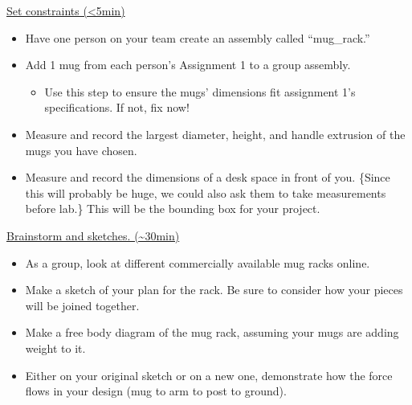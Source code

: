 \documentclass[11pt,letterpaper]{article}
\begin{document}
\begin{AssignmentSteps}
  \item \underline{Set constraints (\textless5min)}
    \begin{itemize}
      \item Have one person on your team create an assembly called ``mug\_rack.''
      \item Add 1 mug from each person's Assignment 1 to a group assembly.
        \begin{itemize}
          \item Use this step to ensure the mugs' dimensions fit assignment 1's specifications. If not, fix now!
        \end{itemize}
      \item Measure and record the largest diameter, height, and handle extrusion of the mugs you have chosen.
      \item Measure and record the dimensions of a desk space in front of you. \{Since this will probably be huge, we
        could also ask them to take measurements before lab.\} This will be the bounding box for your project.
    \end{itemize}
  \item \underline{Brainstorm and sketches. (\textasciitilde30min)}
    \begin{itemize}
      \item As a group, look at different commercially available mug racks online.
      \item Make a sketch of your plan for the rack. Be sure to consider how your pieces will be joined together.
      \item Make a free body diagram of the mug rack, assuming your mugs are adding weight to it.
      \item Either on your original sketch or on a new one, demonstrate how the force flows in your design (mug to arm to
        post to ground).
    \end{itemize}
\end{AssignmentSteps}
\end{document}
